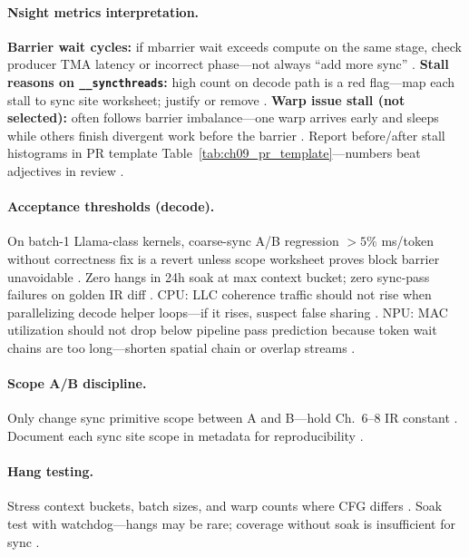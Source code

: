\paragraph{Nsight metrics interpretation.}
\textbf{Barrier wait cycles:} if mbarrier wait exceeds compute on the same stage, check producer TMA latency or incorrect phase---not always ``add more sync'' \citep{semianalysis2024tma,shah2024flashattention3}.
\textbf{Stall reasons on \texttt{\_\_syncthreads}:} high count on decode path is a red flag---map each stall to sync site worksheet; justify or remove \citep{patel2025llminference,nvidia2022hopper}.
\textbf{Warp issue stall (not selected):} often follows barrier imbalance---one warp arrives early and sleeps while others finish divergent work before the barrier \citep{nvidia2022hopper,yirage2026}.
Report before/after stall histograms in PR template Table~\ref{tab:ch09_pr_template}---numbers beat adjectives in review \citep{chen2020compilerbasedhardw,taxbreak2026}.

\paragraph{Acceptance thresholds (decode).}
On batch-1 Llama-class kernels, coarse-sync A/B regression $>5\%$ ms/token without correctness fix is a revert unless scope worksheet proves block barrier unavoidable \citep{patel2025llminference,memoryfloor2026}.
Zero hangs in 24h soak at max context bucket; zero sync-pass failures on golden IR diff \citep{taxbreak2026,yirage2026,mpk2025}.
CPU: LLC coherence traffic should not rise when parallelizing decode helper loops---if it rises, suspect false sharing \citep{dlbook,chen2020compilerbasedhardw}.
NPU: MAC utilization should not drop below pipeline pass prediction because token wait chains are too long---shorten spatial chain or overlap streams \citep{amd2024xdna,amd2024aie}.

\paragraph{Scope A/B discipline.}
Only change sync primitive scope between A and B---hold Ch.~6--8 IR constant \citep{yirage2026,wu2024mirage,dao2022flashattention}.
Document each sync site scope in metadata for reproducibility \citep{chen2020compilerbasedhardw,mpk2025,shah2024flashattention3}.

\paragraph{Hang testing.}
Stress context buckets, batch sizes, and warp counts where CFG differs \citep{nvidia2024cudagraphs,kwon2023vllm,patel2025llminference}.
Soak test with watchdog---hangs may be rare; coverage without soak is insufficient for sync \citep{taxbreak2026,mpk2025,yirage2026}.


